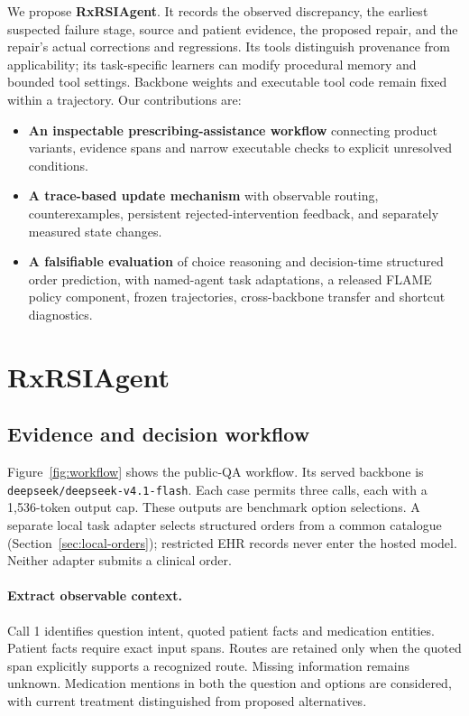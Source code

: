 We propose \textbf{RxRSIAgent}. It records the observed discrepancy, the earliest suspected failure stage, source and patient evidence, the proposed repair, and the repair's actual corrections and regressions. Its tools distinguish provenance from applicability; its task-specific learners can modify procedural memory and bounded tool settings. Backbone weights and executable tool code remain fixed within a trajectory. Our contributions are:
\begin{itemize}
\item \textbf{An inspectable prescribing-assistance workflow} connecting product variants, evidence spans and narrow executable checks to explicit unresolved conditions.
\item \textbf{A trace-based update mechanism} with observable routing, counterexamples, persistent rejected-intervention feedback, and separately measured state changes.
\item \textbf{A falsifiable evaluation} of choice reasoning and decision-time structured order prediction, with named-agent task adaptations, a released FLAME policy component, frozen trajectories, cross-backbone transfer and shortcut diagnostics.
\end{itemize}

\section{RxRSIAgent}
\subsection{Evidence and decision workflow}
Figure~\ref{fig:workflow} shows the public-QA workflow. Its served backbone is \texttt{deepseek/deepseek-v4.1-flash}. Each case permits three calls, each with a 1,536-token output cap. These outputs are benchmark option selections. A separate local task adapter selects structured orders from a common catalogue (Section~\ref{sec:local-orders}); restricted EHR records never enter the hosted model. Neither adapter submits a clinical order.

\paragraph{Extract observable context.}
Call 1 identifies question intent, quoted patient facts and medication entities. Patient facts require exact input spans. Routes are retained only when the quoted span explicitly supports a recognized route. Missing information remains unknown. Medication mentions in both the question and options are considered, with current treatment distinguished from proposed alternatives.


